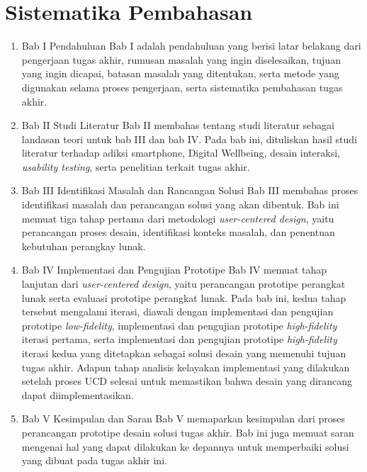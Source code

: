 \section{Sistematika Pembahasan}

\begin{enumerate}
  \item Bab I Pendahuluan
  \subitem Bab I adalah pendahuluan yang berisi latar belakang dari pengerjaan tugas akhir, rumusan masalah yang ingin diselesaikan, tujuan yang ingin dicapai, batasan masalah yang ditentukan, serta metode yang digunakan selama proses pengerjaan, serta sistematika pembahasan tugas akhir.
   
  \item Bab II Studi Literatur
  \subitem Bab II membahas tentang studi literatur sebagai landasan teori untuk bab III dan bab IV. Pada bab ini, dituliskan hasil studi literatur terhadap adiksi smartphone, Digital Wellbeing, desain interaksi, \textit{usability testing}, serta penelitian terkait tugas akhir.
 
  \item Bab III Identifikasi Masalah dan Rancangan Solusi
  \subitem Bab III membahas proses identifikasi masalah dan perancangan solusi yang akan dibentuk. Bab ini memuat tiga tahap pertama dari metodologi \textit{user-centered design}, yaitu perancangan proses desain, identifikasi konteks masalah, dan penentuan kebutuhan perangkay lunak.
 
  \item Bab IV Implementasi dan Pengujian Prototipe
  \subitem Bab IV memuat tahap lanjutan dari \textit{user-centered design}, yaitu perancangan prototipe perangkat lunak serta evaluasi prototipe perangkat lunak. Pada bab ini, kedua tahap tersebut mengalami iterasi, diawali dengan implementasi dan pengujian prototipe \textit{low-fidelity}, implementasi dan pengujian prototipe \textit{high-fidelity} iterasi pertama, serta implementasi dan pengujian prototipe \textit{high-fidelity} iterasi kedua yang ditetapkan sebagai solusi desain yang memenuhi tujuan tugas akhir. Adapun tahap analisis kelayakan implementasi yang dilakukan setelah proses UCD selesai untuk memastikan bahwa desain yang dirancang dapat diimplementasikan.
 
  \item Bab V Kesimpulan dan Saran
  \subitem Bab V memaparkan kesimpulan dari proses perancangan prototipe desain solusi tugas akhir. Bab ini juga memuat saran mengenai hal yang dapat dilakukan ke depannya untuk memperbaiki solusi yang dibuat pada tugas akhir ini.
\end{enumerate}